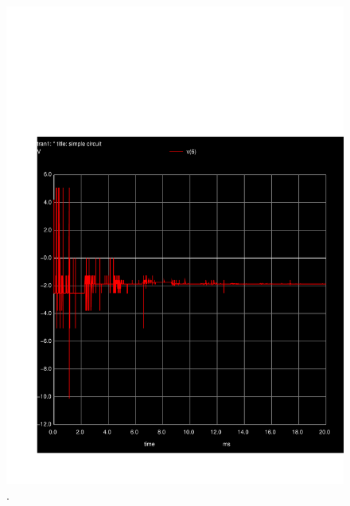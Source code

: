 \begin{figure}[h] \centering
\includegraphics[width=0.6\linewidth]{trans.pdf}
\caption{.}
\label{fig:rc1}
\end{figure}

